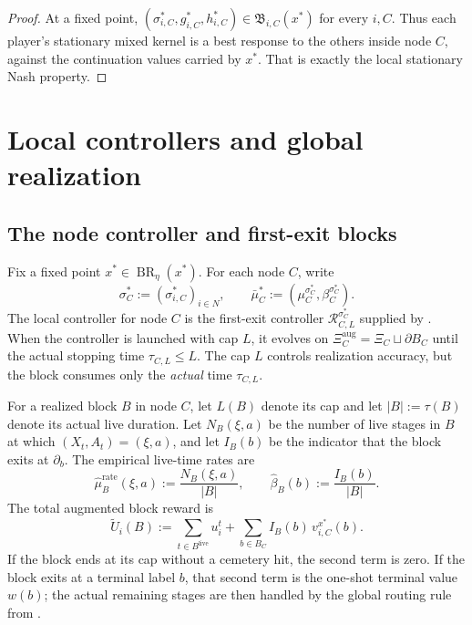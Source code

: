 \documentclass[12pt]{article}
\theoremstyle{definition}
\newcommand{\1}{\mathbf{1}}
\DeclareMathOperator{\BR}{BR}
\begin{document}
\begin{proof}
At a fixed point,
$(\sigma_{i,C}^*,g_{i,C}^*,h_{i,C}^*)\in\mathfrak B_{i,C}(x^*)$ for every $i,C$.
Thus each player's stationary mixed kernel is a best response to the others inside
node $C$, against the continuation values carried by $x^*$. That is exactly the
local stationary Nash property.
\end{proof}

\section{Local controllers and global realization}
\label{sec:realization}


\subsection{The node controller and first-exit blocks}

Fix a fixed point $x^*\in\BR_\eta(x^*)$. For each node $C$, write
\[
\sigma_C^*:=(\sigma_{i,C}^*)_{i\in N},
\qquad
\bar\mu_C^*:=(\mu_C^{\sigma_C^*},\beta_C^{\sigma_C^*}).
\]
The local controller for node $C$ is the first-exit controller
$\mathcal R_{C,L}^{\sigma_C^*}$ supplied by . When the
controller is launched with cap $L$, it evolves on
$\Xi_C^{\mathrm{aug}}=\Xi_C\sqcup\partial B_C$ until the actual stopping time
$\tau_{C,L}\le L$. The cap $L$ controls realization accuracy, but the block
consumes only the \emph{actual} time $\tau_{C,L}$.

For a realized block $B$ in node $C$, let $L(B)$ denote its cap and let
$|B|:=\tau(B)$ denote its actual live duration. Let
$N_B(\xi,a)$ be the number of live stages in $B$ at which $(X_t,A_t)=(\xi,a)$, and
let $I_B(b)$ be the indicator that the block exits at $\partial_b$. The empirical
live-time rates are
\[
\widehat\mu_B^{\mathrm{rate}}(\xi,a):=\frac{N_B(\xi,a)}{|B|},
\qquad
\widehat\beta_B(b):=\frac{I_B(b)}{|B|}.
\]
The total augmented block reward is
\begin{equation}
\label{eq:aug-block-payoff}
\widetilde U_i(B)
:=
\sum_{t\in B^{\mathrm{live}}} u_i^t
+
\sum_{b\in B_C}I_B(b)\,v_{i,C}^{x^*}(b).
\end{equation}
If the block ends at its cap without a cemetery hit, the second term is zero.
If the block exits at a terminal label $b$, that second term is the one-shot
terminal value $w(b)$; the actual remaining stages are then handled by the
global routing rule from .
\end{document}
